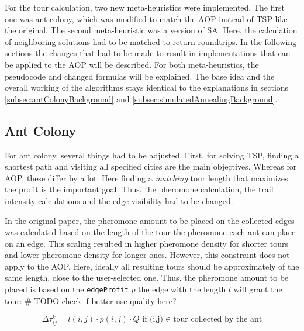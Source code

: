 For the tour calculation, two new meta-heuristics were implemented.
The first one was ant colony, which was modified to match the AOP instead of TSP like the original.
The second meta-heuristic was a version of SA.
Here, the calculation of neighboring solutions had to be matched to return roundtrips.
In the following sections the changes that had to be made to result in implementations that can be applied to the AOP will be described.
For both meta-heuristics, the pseudocode and changed formulas will be explained.
The base idea and the overall working of the algorithms stays identical to the explanations in sections \ref{subsec:antColonyBackground} and \ref{subsec:simulatedAnnealingBackground}.


\subsection{Ant Colony}
\label{subsec:antColonyImplementation}

For ant colony, several things had to be adjusted. 
First, for solving TSP, finding a shortest path and visiting all specified cities are the main objectives.
Whereas for AOP, these differ by a lot:
Here finding a \textit{matching} tour length that maximizes the profit is the important goal. 
Thus, the pheromone calculation, the trail intensity calculations and the edge visibility had to be changed.


In the original paper, the pheromone amount to be placed on the collected edges was calculated based on the length of the tour the pheromone each ant can place on an edge. 
This scaling resulted in higher pheromone density for shorter tours and lower pheromone density for longer ones.
However, this constraint does not apply to the AOP.
Here, ideally all resulting tours should be approximately of the same length, close to the user-selected one.
Thus, the pheromone amount to be placed is based on the \texttt{edgeProfit} $p$ the edge with the length $l$ will grant the tour:
\# TODO check if better use quality here?

\begin{equation}
	\label{eq:newPheromoneCalc}
	\Delta\tau_{ij}^k = l(i,j) \cdot p(i,j) \cdot Q \text{ if (i,j)} \in \text{tour collected by the ant}
\end{equation}

